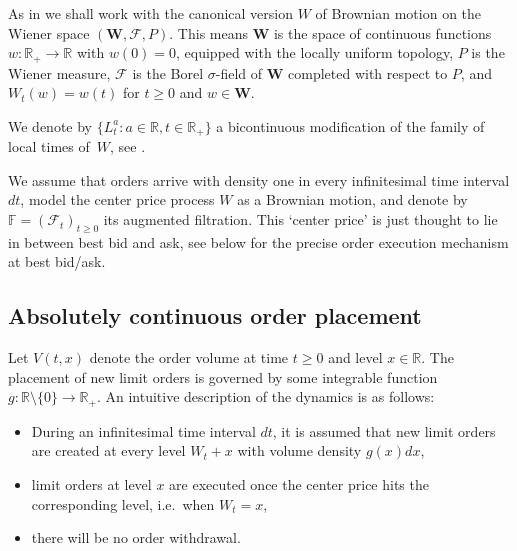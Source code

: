 \documentclass[11pt]{scrartcl}
\begin{document}
\label{sec:brown} As in \cite[Sec.XII.2, p.480]{RY} we shall work with the
canonical version $W$ of Brownian motion on the Wiener space $(\mathbf{W},%
\mathcal{F},P)$. This means $\mathbf{W}$ is the space of continuous
functions $w:\mathbb{R}_+\to\mathbb{R}$ with $w(0)=0$, equipped with the
locally uniform topology, $P$ is the Wiener measure, $\mathcal{F}$ is the
Borel $\sigma$-field of $\mathbf{W}$ completed with respect to $P$, and $%
W_t(w)=w(t)$ for $t\geq0$ and $w\in\mathbf{W}$.

We denote by $\{L_{t}^{a}:a\in \mathbb{R},t\in \mathbb{R}_{+}\}$ a
bicontinuous modification of the family of local times of~$W$, see \cite[%
Thm.VI.1.7, p.225]{RY}.

We assume that orders arrive with density one in every infinitesimal time
interval $dt$, model the center price process $W$ as a Brownian motion, and
denote by $\mathbb{F=}\left( \mathcal{F}_{t}\right) _{t\geq 0}$ its
augmented filtration. This `center price' is just thought to lie in between
best bid and ask, see below for the precise order execution mechanism at
best bid/ask.

\subsection{Absolutely continuous order placement}

\label{s:ac order placement} Let $V(t,x)$ denote the order volume at time $%
t\geq0$ and level $x\in\mathbb{R}$. The placement of new limit orders is
governed by some integrable function $g:\mathbb{R}\setminus\{0\}\to\mathbb{R}%
_+$. An intuitive description of the dynamics is as follows:

\begin{itemize}
\item During an infinitesimal time interval $dt$, it is assumed that new
limit orders are created at every level $W_t+x$ with volume density $g(x)dx$,

\item limit orders at level $x$ are executed once the center price hits the
corresponding level, i.e.\ when $W_t=x$,

\item there will be no order withdrawal.
\end{itemize}
\end{document}
